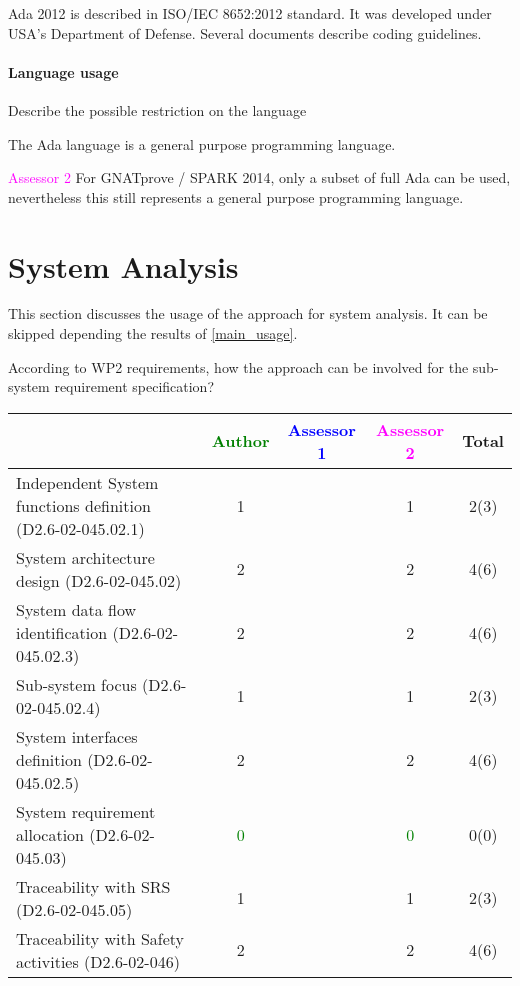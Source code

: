 Ada 2012 is described in ISO/IEC 8652:2012 standard. It was developed
under USA's Department of Defense. Several documents describe coding
guidelines.


\paragraph{Language usage} Describe the possible restriction on the language

The Ada language is a general purpose programming language.

\textcolor{magenta}{Assessor 2} For GNATprove / SPARK 2014, only a subset of
full Ada can be used, nevertheless this still represents a general purpose
programming language.

\section{System Analysis}
This section discusses the usage of the approach for system analysis.
It can be skipped depending the results of \ref{main_usage}.

According to WP2 requirements, how the approach can be involved for
the sub-system requirement specification?

\begin{tabular}{|l | c | c | c | c|}
\hline
& \textcolor{green}{Author} & \textcolor{blue}{Assessor 1} & \textcolor{magenta}{Assessor 2} & Total \\
\hline
Independent System functions definition (D2.6-02-045.02.1)  & 1     & & 1     &  2(3) \\
\hline
System architecture design (D2.6-02-045.02) & 2     & & 2     &  4(6) \\
\hline
System data flow identification (D2.6-02-045.02.3)  & 2     & & 2     &  4(6) \\
\hline
Sub-system focus (D2.6-02-045.02.4)  & 1     & & 1     &  2(3) \\
\hline
System interfaces definition (D2.6-02-045.02.5)  & 2     & & 2     &  4(6) \\
\hline
System requirement allocation (D2.6-02-045.03)  & \textcolor{green}{0} & & \textcolor{green}{0} &  0(0) \\
\hline
Traceability with SRS (D2.6-02-045.05)  & 1     & & 1     &  2(3) \\
\hline
Traceability with Safety activities (D2.6-02-046)  & 2     & & 2     &  4(6) \\
\hline
\end{tabular}



